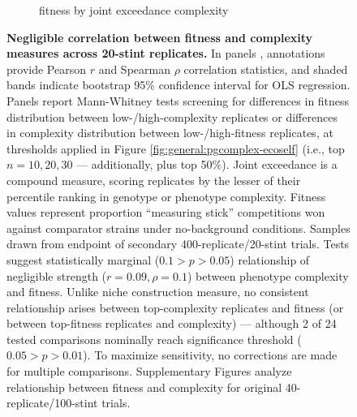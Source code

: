 \begin{figure}
\begin{subfigure}{0.32\linewidth}
\caption{\footnotesize fitness by joint exceedance complexity}
\label{fig:general-supp-nobg:split-fitness-pgjoint}
\end{subfigure}

\vspace{-1ex}

\caption{%
\textbf{Negligible correlation between fitness and complexity measures across 20-stint replicates.}
\footnotesize
In panels , annotations provide Pearson $r$ and Spearman $\rho$ correlation statistics, and shaded bands indicate bootstrap 95\% confidence interval for OLS regression.
Panels  report Mann-Whitney tests screening for differences in fitness distribution between low-/high-complexity replicates or differences in complexity distribution between low-/high-fitness replicates, at thresholds applied in Figure \ref{fig:general:pgcomplex-ecoself} (i.e., top $n=10,20,30$ --- additionally, plus top 50\%).
Joint exceedance is a compound measure, scoring replicates by the lesser of their percentile ranking in genotype or phenotype complexity.
Fitness values represent proportion ``measuring stick'' competitions won against comparator strains under no-background conditions.
Samples drawn from endpoint of secondary 400-replicate/20-stint trials.
Tests suggest statistically marginal ($0.1 > p > 0.05$) relationship of negligible strength ($r=0.09,\rho=0.1$) between phenotype complexity and fitness.
Unlike niche construction measure, no consistent relationship arises between top-complexity replicates and fitness (or between top-fitness replicates and complexity) --- although 2 of 24 tested comparisons nominally reach significance threshold ($0.05 > p > 0.01$).
To maximize sensitivity, no corrections are made for multiple comparisons.
Supplementary Figures  analyze relationship between fitness and complexity for original 40-replicate/100-stint trials.
}
\label{fig:general-supp-nobg}

\end{figure}
